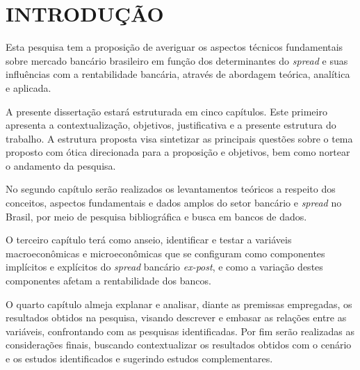 \documentclass[
  12pt,
  12pt,
  openright,
  oneside,
  a4paper,
  chapter=TITLE,
  section=TITLE,
  subsection=TITLE,
  subsubsection=TITLE,
  english,
  portugues,
  sumario=tradicional]{abntex2}
\begin{document}






\textual
\pagestyle{simple}
\parindent 1.50cm

\chapter[INTRODUÇÃO]{INTRODUÇÃO}

Esta pesquisa tem a proposição de averiguar os aspectos técnicos fundamentais sobre mercado bancário brasileiro em função dos determinantes do \emph{spread} e suas influências com a rentabilidade bancária, através de abordagem teórica, analítica e aplicada.

A presente dissertação estará estruturada em cinco capítulos. Este primeiro apresenta a contextualização, objetivos, justificativa e a presente estrutura do trabalho. A estrutura proposta visa sintetizar as principais questões sobre o tema proposto com ótica direcionada para a proposição e objetivos, bem como nortear o andamento da pesquisa.

No segundo capítulo serão realizados os levantamentos teóricos a respeito dos conceitos, aspectos fundamentais e dados amplos do setor bancário e \emph{spread} no Brasil, por meio de pesquisa bibliográfica e busca em bancos de dados.

O terceiro capítulo terá como anseio, identificar e testar a variáveis macroeconômicas e microeconômicas que se configuram como componentes implícitos e explícitos do \emph{spread} bancário \emph{ex-post}, e como a variação destes componentes afetam a rentabilidade dos bancos.

O quarto capítulo almeja explanar e analisar, diante as premissas empregadas, os resultados obtidos na pesquisa, visando descrever e embasar as relações entre as variáveis, confrontando com as pesquisas identificadas. Por fim serão realizadas as considerações finais, buscando contextualizar os resultados obtidos com o cenário e os estudos identificados e sugerindo estudos complementares.
\end{document}
